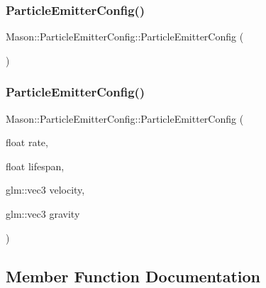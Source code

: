 \subsubsection{\texorpdfstring{Particle\+Emitter\+Config()}{ParticleEmitterConfig()}\hspace{0.1cm}{\footnotesize\ttfamily [1/2]}}
{\footnotesize\ttfamily Mason\+::\+Particle\+Emitter\+Config\+::\+Particle\+Emitter\+Config (\begin{DoxyParamCaption}{ }\end{DoxyParamCaption})\hspace{0.3cm}{\ttfamily [inline]}}

\hypertarget{struct_mason_1_1_particle_emitter_config_a50ce1e6e4420674c75b12b402ac5bf33}{}\label{struct_mason_1_1_particle_emitter_config_a50ce1e6e4420674c75b12b402ac5bf33} 
\subsubsection{\texorpdfstring{Particle\+Emitter\+Config()}{ParticleEmitterConfig()}\hspace{0.1cm}{\footnotesize\ttfamily [2/2]}}
{\footnotesize\ttfamily Mason\+::\+Particle\+Emitter\+Config\+::\+Particle\+Emitter\+Config (\begin{DoxyParamCaption}\item[{float}]{rate,  }\item[{float}]{lifespan,  }\item[{glm\+::vec3}]{velocity,  }\item[{glm\+::vec3}]{gravity }\end{DoxyParamCaption})\hspace{0.3cm}{\ttfamily [inline]}}



\subsection{Member Function Documentation}
\hypertarget{struct_mason_1_1_particle_emitter_config_a9ee7a40d6337225cccab9f801e8f793f}{}\label{struct_mason_1_1_particle_emitter_config_a9ee7a40d6337225cccab9f801e8f793f} 
